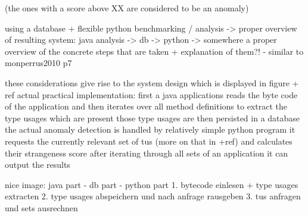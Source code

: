 (the ones with a score above XX are considered to be an anomaly)


using a database + flexible python benchmarking / analysis
-> proper overview of resulting system: java analysis -> db -> python
-> somewhere a proper overview of the concrete steps that are taken + explanation of them?! - similar to monperrus2010 p7

these considerations give rise to the system design which is displayed in figure + ref
actual practical implementation:
first a java applications reads the byte code of the application and then iterates over all method definitions to extract the type usages which are present
those type usages are then persisted in a database
the actual anomaly detection is handled by relatively simple python program
it requests the currently relevant set of tus (more on that in +ref) and calculates their strangeness score
after iterating through all sets of an application it can output the results

nice image:
java part - db part - python part
1. bytecode einlesen + type usages extracten
2. type usages abspeichern und nach anfrage rausgeben
3. tus anfragen und sets ausrechnen

